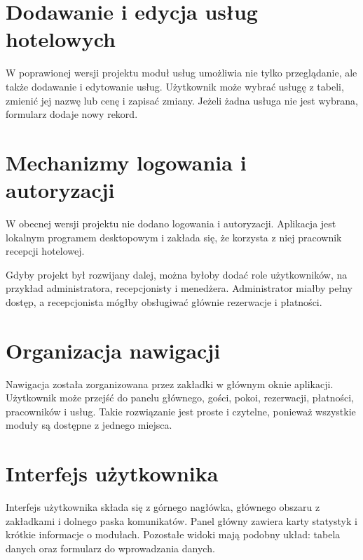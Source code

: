 

\section{Dodawanie i edycja usług hotelowych}

W poprawionej wersji projektu moduł usług umożliwia nie tylko przeglądanie, ale także dodawanie i edytowanie usług. Użytkownik może wybrać usługę z tabeli, zmienić jej nazwę lub cenę i zapisać zmiany. Jeżeli żadna usługa nie jest wybrana, formularz dodaje nowy rekord.



\section{Mechanizmy logowania i autoryzacji}

W obecnej wersji projektu nie dodano logowania i autoryzacji. Aplikacja jest lokalnym programem desktopowym i zakłada się, że korzysta z niej pracownik recepcji hotelowej.

Gdyby projekt był rozwijany dalej, można byłoby dodać role użytkowników, na przykład administratora, recepcjonisty i menedżera. Administrator miałby pełny dostęp, a recepcjonista mógłby obsługiwać głównie rezerwacje i płatności.

\section{Organizacja nawigacji}

Nawigacja została zorganizowana przez zakładki w głównym oknie aplikacji. Użytkownik może przejść do panelu głównego, gości, pokoi, rezerwacji, płatności, pracowników i usług. Takie rozwiązanie jest proste i czytelne, ponieważ wszystkie moduły są dostępne z jednego miejsca.



\section{Interfejs użytkownika}

Interfejs użytkownika składa się z górnego nagłówka, głównego obszaru z zakładkami i dolnego paska komunikatów. Panel główny zawiera karty statystyk i krótkie informacje o modułach. Pozostałe widoki mają podobny układ: tabela danych oraz formularz do wprowadzania danych.

